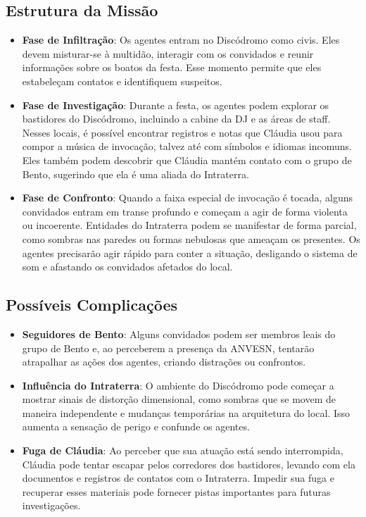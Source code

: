 \subsection{Estrutura da Missão}
\begin{itemize}
    \item \textbf{Fase de Infiltração}: Os agentes entram no Discódromo como civis. Eles devem misturar-se à multidão, interagir com os convidados e reunir informações sobre os boatos da festa. Esse momento permite que eles estabeleçam contatos e identifiquem suspeitos.

    \item \textbf{Fase de Investigação}: Durante a festa, os agentes podem explorar os bastidores do Discódromo, incluindo a cabine da DJ e as áreas de staff. Nesses locais, é possível encontrar registros e notas que Cláudia usou para compor a música de invocação, talvez até com símbolos e idiomas incomuns. Eles também podem descobrir que Cláudia mantém contato com o grupo de Bento, sugerindo que ela é uma aliada do Intraterra.

    \item \textbf{Fase de Confronto}: Quando a faixa especial de invocação é tocada, alguns convidados entram em transe profundo e começam a agir de forma violenta ou incoerente. Entidades do Intraterra podem se manifestar de forma parcial, como sombras nas paredes ou formas nebulosas que ameaçam os presentes. Os agentes precisarão agir rápido para conter a situação, desligando o sistema de som e afastando os convidados afetados do local.
\end{itemize}

\subsection{Possíveis Complicações}
\begin{itemize}
    \item \textbf{Seguidores de Bento}: Alguns convidados podem ser membros leais do grupo de Bento e, ao perceberem a presença da ANVESN, tentarão atrapalhar as ações dos agentes, criando distrações ou confrontos.

    \item \textbf{Influência do Intraterra}: O ambiente do Discódromo pode começar a mostrar sinais de distorção dimensional, como sombras que se movem de maneira independente e mudanças temporárias na arquitetura do local. Isso aumenta a sensação de perigo e confunde os agentes.

    \item \textbf{Fuga de Cláudia}: Ao perceber que sua atuação está sendo interrompida, Cláudia pode tentar escapar pelos corredores dos bastidores, levando com ela documentos e registros de contatos com o Intraterra. Impedir sua fuga e recuperar esses materiais pode fornecer pistas importantes para futuras investigações.
\end{itemize}

